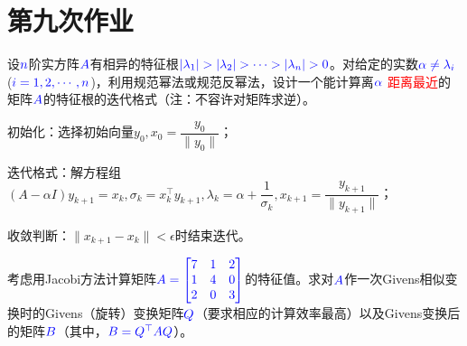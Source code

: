 \chapter{第九次作业}

    \begin{homework}[4pts]
        设$\textcolor{blue}{n}$阶实方阵$\textcolor{blue}{A}$有相异的特征根$\textcolor{blue}{|\lambda_1|>|\lambda_2|>\cdots>|\lambda_n|>0}$。对给定的实数$\textcolor{blue}{\alpha\neq\lambda_i}$ ($\textcolor{blue}{i=1,2,\cdots,n}$)，利用规范幂法或规范反幂法，设计一个能计算离$\textcolor{blue}{\alpha}$ \textcolor{red}{距离最近}的矩阵$\textcolor{blue}{A}$的特征根的迭代格式（注：不容许对矩阵求逆）。
    \end{homework}

    \begin{solution}
        初始化：选择初始向量$y_0,x_0=\dfrac{y_0}{\|y_0\|}$；

        迭代格式：解方程组$(A-\alpha I)y_{k+1}=x_k,\sigma_k=x^{\top}_k y_{k+1},\lambda_k=\alpha+\dfrac1{\sigma_k},x_{k+1}=\dfrac{y_{k+1}}{\|y_{k+1}\|}$；

        收敛判断：$\|x_{k+1}-x_k\|<\epsilon$时结束迭代。
    \end{solution}

    \begin{homework}[8pts]
        考虑用Jacobi方法计算矩阵$\textcolor{blue}{A=\begin{bmatrix}7&1&2\\1&4&0\\2&0&3\end{bmatrix}}$的特征值。求对$\textcolor{blue}{A}$作一次Givens相似变换时的Givens（旋转）变换矩阵$\textcolor{blue}{Q}$（要求相应的计算效率最高）以及Givens变换后的矩阵$\textcolor{blue}{B}$（其中，$\textcolor{blue}{B=Q^{\top} AQ}$）。
    \end{homework}

